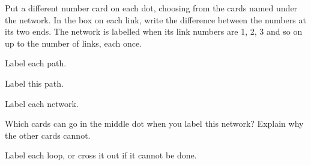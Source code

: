 \documentclass[12pt]{article}
\begin{document}
\setlength{\baselineskip}{17pt}

Put a different number card on each dot, choosing from the cards named under the network. In the box on each link, write the difference between the numbers at its two ends. The network is labelled when its link numbers are 1, 2, 3 and so on up to the number of links, each once.

\medskip
\begin{center}
\end{center}

\vspace{0.5cm}
 Label each path.

\vspace{0.4cm}
\begin{center}

\vspace{0.7cm}

\vspace{0.7cm}
\end{center}

\newpage
{} Label this path.

\vspace{0.8cm}
\begin{center}
\end{center}

\newpage
{} Label each network.

\vspace{0.8cm}
\begin{center}

\vspace{2.0cm}
\end{center}

\newpage
{} Which cards can go in the middle dot when you label this network? Explain why the other cards cannot.

\vspace{0.6cm}
\begin{center}

\vspace{1.0cm}
\end{center}

\newpage
{} Label each loop, or cross it out if it cannot be done.

\vspace{0.6cm}
\hfill{}

\vspace{0.8cm}
\hfill{}
\end{document}
